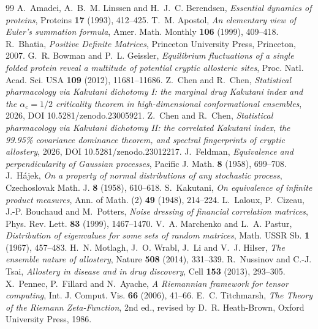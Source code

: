 \documentclass[11pt,reqno]{amsart}
\theoremstyle{plain}
\theoremstyle{definition}
\theoremstyle{remark}
\numberwithin{equation}{section}
\begin{document}
\begin{thebibliography}{99}
 A.~Amadei, A.~B.~M. Linssen and H.~J.~C. Berendsen, \emph{Essential dynamics of proteins}, Proteins \textbf{17} (1993), 412--425.
 T.~M. Apostol, \emph{An elementary view of Euler's summation formula}, Amer. Math. Monthly \textbf{106} (1999), 409--418.
 R.~Bhatia, \emph{Positive Definite Matrices}, Princeton University Press, Princeton, 2007.
 G.~R. Bowman and P.~L. Geissler, \emph{Equilibrium fluctuations of a single folded protein reveal a multitude of potential cryptic allosteric sites}, Proc. Natl. Acad. Sci. USA \textbf{109} (2012), 11681--11686.
 Z.~Chen and R.~Chen, \emph{Statistical pharmacology via Kakutani dichotomy I: the marginal drug Kakutani index and the $\alpha_c=1/2$ criticality theorem in high-dimensional conformational ensembles}, 2026, DOI 10.5281/zenodo.23005921.
 Z.~Chen and R.~Chen, \emph{Statistical pharmacology via Kakutani dichotomy II: the correlated Kakutani index, the 99.95\% covariance dominance theorem, and spectral fingerprints of cryptic allostery}, 2026, DOI 10.5281/zenodo.23012217.
 J.~Feldman, \emph{Equivalence and perpendicularity of Gaussian processes}, Pacific J. Math. \textbf{8} (1958), 699--708.
 J.~H\'ajek, \emph{On a property of normal distributions of any stochastic process}, Czechoslovak Math. J. \textbf{8} (1958), 610--618.
 S.~Kakutani, \emph{On equivalence of infinite product measures}, Ann. of Math. (2) \textbf{49} (1948), 214--224.
 L.~Laloux, P.~Cizeau, J.-P. Bouchaud and M.~Potters, \emph{Noise dressing of financial correlation matrices}, Phys. Rev. Lett. \textbf{83} (1999), 1467--1470.
 V.~A. Marchenko and L.~A. Pastur, \emph{Distribution of eigenvalues for some sets of random matrices}, Math. USSR Sb. \textbf{1} (1967), 457--483.
 H.~N. Motlagh, J.~O. Wrabl, J.~Li and V.~J. Hilser, \emph{The ensemble nature of allostery}, Nature \textbf{508} (2014), 331--339.
 R.~Nussinov and C.-J. Tsai, \emph{Allostery in disease and in drug discovery}, Cell \textbf{153} (2013), 293--305.
 X.~Pennec, P.~Fillard and N.~Ayache, \emph{A Riemannian framework for tensor computing}, Int. J. Comput. Vis. \textbf{66} (2006), 41--66.
 E.~C. Titchmarsh, \emph{The Theory of the Riemann Zeta-Function}, 2nd ed., revised by D.~R. Heath-Brown, Oxford University Press, 1986.
\end{thebibliography}
\end{document}
